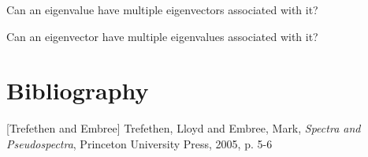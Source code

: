 \documentclass{ximera}
\begin{document}
\begin{problem}\label{prob:eigenmultchoice}
Can an eigenvalue have multiple eigenvectors associated with it?
\begin{multipleChoice}
    \end{multipleChoice}
        
    Can an eigenvector have multiple eigenvalues associated with it?
    \begin{multipleChoice}
    \end{multipleChoice}
\end{problem}
    
\section*{Bibliography}
[Trefethen and  Embree] Trefethen, Lloyd and Embree, Mark, {\it Spectra and Pseudospectra}, Princeton University Press, 2005, p. 5-6
\end{document}
